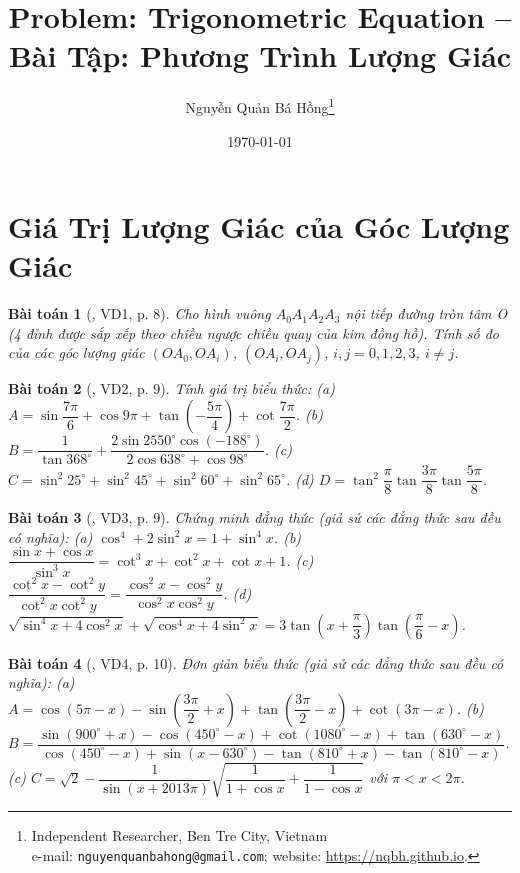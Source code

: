 \documentclass{article}
\title{Problem: Trigonometric Equation -- Bài Tập: Phương Trình Lượng Giác}
\author{Nguyễn Quản Bá Hồng\footnote{Independent Researcher, Ben Tre City, Vietnam\\e-mail: \texttt{nguyenquanbahong@gmail.com}; website: \url{https://nqbh.github.io}.}}
\date{\today}
\newtheorem{baitoan}{Bài toán}
\begin{document}
\maketitle
\tableofcontents


\section{Giá Trị Lượng Giác của Góc Lượng Giác}

\begin{baitoan}[\cite{Hung_nang_cao_phat_trien_Toan_11_tap_1}, VD1, p. 8]
	Cho hình vuông $A_0A_1A_2A_3$ nội tiếp đường  tròn tâm O (4 đỉnh được sắp xếp theo chiều ngược chiều quay của kim đồng hồ). Tính số đo của các góc lượng giác $(OA_0,OA_i)$, $(OA_i,OA_j)$, $i,j = 0,1,2,3$, $i\ne j$.
\end{baitoan}

\begin{baitoan}[\cite{Hung_nang_cao_phat_trien_Toan_11_tap_1}, VD2, p. 9]
	Tính giá trị biểu thức: (a) $A = \sin\dfrac{7\pi}{6} + \cos9\pi + \tan\left(-\dfrac{5\pi}{4}\right) + \cot\dfrac{7\pi}{2}$. (b) $B = \dfrac{1}{\tan368^\circ} + \dfrac{2\sin2550^\circ\cos(-188^\circ)}{2\cos638^\circ + \cos98^\circ}$. (c) $C = \sin^2 25^\circ + \sin^2 45^\circ + \sin^2 60^\circ + \sin^2 65^\circ$. (d) $D = \tan^2\dfrac{\pi}{8}\tan\dfrac{3\pi}{8}\tan\dfrac{5\pi}{8}$.
\end{baitoan}

\begin{baitoan}[\cite{Hung_nang_cao_phat_trien_Toan_11_tap_1}, VD3, p. 9]
	Chứng minh đẳng thức (giả sử các đẳng thức sau đều có nghĩa): (a) $\cos^4 + 2\sin^2x = 1 + \sin^4x$. (b) $\dfrac{\sin x + \cos x}{\sin^3x} = \cot^3x + \cot^2x + \cot x + 1$. (c) $\dfrac{\cot^2x - \cot^2y}{\cot^2x\cot^2y} = \dfrac{\cos^2x - \cos^2y}{\cos^2x\cos^2y}$. (d) $\sqrt{\sin^4x + 4\cos^2x} + \sqrt{\cos^4x + 4\sin^2x} = 3\tan\left(x + \dfrac{\pi}{3}\right)\tan\left(\dfrac{\pi}{6} - x\right)$.
\end{baitoan}

\begin{baitoan}[\cite{Hung_nang_cao_phat_trien_Toan_11_tap_1}, VD4, p. 10]
	Đơn giản biểu thức (giả sử các đẳng thức sau đều có nghĩa): (a) $A = \cos(5\pi - x) - \sin\left(\dfrac{3\pi}{2} + x\right) + \tan\left(\dfrac{3\pi}{2} - x\right) + \cot(3\pi - x)$. (b) $B = \dfrac{\sin(900^\circ + x) - \cos(450^\circ - x) + \cot(1080^\circ - x) + \tan(630^\circ - x)}{\cos(450^\circ - x) + \sin(x - 630^\circ) - \tan(810^\circ + x) - \tan(810^\circ - x)}$. (c) $C = \sqrt{2} - \dfrac{1}{\sin(x + 2013\pi)}\sqrt{\dfrac{1}{1 + \cos x} + \dfrac{1}{1 - \cos x}}$ với $\pi < x < 2\pi$.
\end{baitoan}
\end{document}
